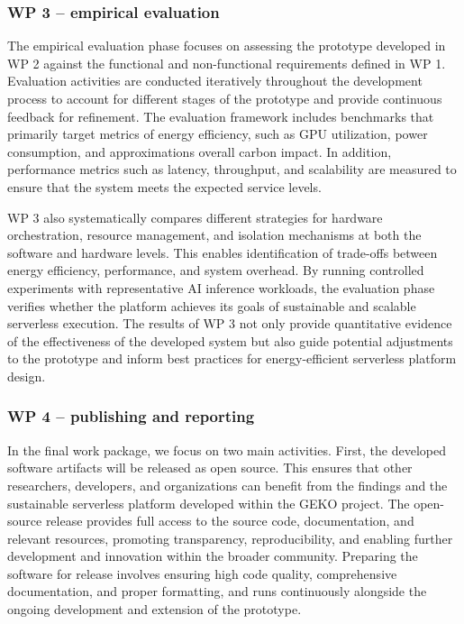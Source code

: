 
\subsubsection{WP 3 -- empirical evaluation}

The empirical evaluation phase focuses on assessing the prototype developed in WP 2 against the functional and non-functional requirements defined in WP 1.
Evaluation activities are conducted iteratively throughout the development process to account for different stages of the prototype and provide continuous feedback for refinement.
The evaluation framework includes benchmarks that primarily target metrics of energy efficiency, such as GPU utilization, power consumption, and approximations overall carbon impact.
In addition, performance metrics such as latency, throughput, and scalability are measured to ensure that the system meets the expected service levels.

WP 3 also systematically compares different strategies for hardware orchestration, resource management, and isolation mechanisms at both the software and hardware levels.
This enables identification of trade-offs between energy efficiency, performance, and system overhead.
By running controlled experiments with representative AI inference workloads, the evaluation phase verifies whether the platform achieves its goals of sustainable and scalable serverless execution.
The results of WP 3 not only provide quantitative evidence of the effectiveness of the developed system but also guide potential adjustments to the prototype and inform best practices for energy-efficient serverless platform design.

\subsubsection{WP 4 -- publishing and reporting}

In the final work package, we focus on two main activities.
First, the developed software artifacts will be released as open source.
This ensures that other researchers, developers, and organizations can benefit from the findings and the sustainable serverless platform developed within the GEKO project.
The open-source release provides full access to the source code, documentation, and relevant resources, promoting transparency, reproducibility, and enabling further development and innovation within the broader community.
Preparing the software for release involves ensuring high code quality, comprehensive documentation, and proper formatting, and runs continuously alongside the ongoing development and extension of the prototype.

